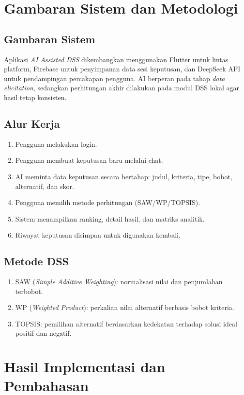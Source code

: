 \documentclass[12pt,a4paper]{article}
\begin{document}
\section{Gambaran Sistem dan Metodologi}
\subsection{Gambaran Sistem}
Aplikasi \textit{AI Assisted DSS} dikembangkan menggunakan Flutter untuk lintas platform, Firebase untuk penyimpanan data sesi keputusan, dan DeepSeek API untuk pendampingan percakapan pengguna. AI berperan pada tahap \textit{data elicitation}, sedangkan perhitungan akhir dilakukan pada modul DSS lokal agar hasil tetap konsisten.

\subsection{Alur Kerja}
\begin{enumerate}
  \item Pengguna melakukan login.
  \item Pengguna membuat keputusan baru melalui chat.
  \item AI meminta data keputusan secara bertahap: judul, kriteria, tipe, bobot, alternatif, dan skor.
  \item Pengguna memilih metode perhitungan (SAW/WP/TOPSIS).
  \item Sistem menampilkan ranking, detail hasil, dan matriks analitik.
  \item Riwayat keputusan disimpan untuk digunakan kembali.
\end{enumerate}

\subsection{Metode DSS}
\begin{enumerate}
  \item SAW (\textit{Simple Additive Weighting}): normalisasi nilai dan penjumlahan terbobot.
  \item WP (\textit{Weighted Product}): perkalian nilai alternatif berbasis bobot kriteria.
  \item TOPSIS: pemilihan alternatif berdasarkan kedekatan terhadap solusi ideal positif dan negatif.
\end{enumerate}

\section{Hasil Implementasi dan Pembahasan}
\end{document}
